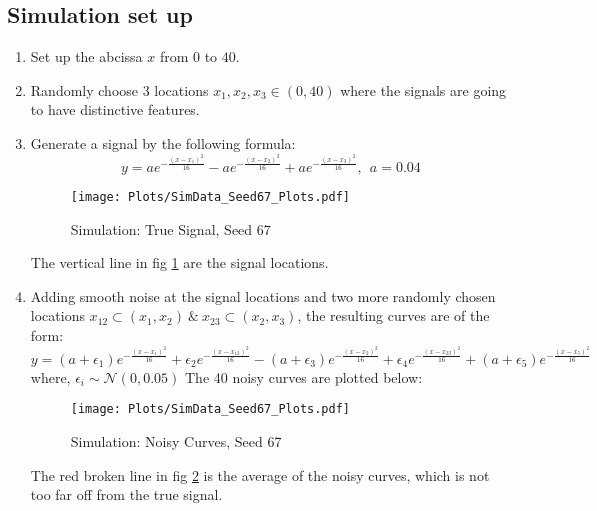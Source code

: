\subsection{Simulation set up}
\begin{enumerate}
\item Set up the abcissa $x$ from $0$ to $40$.

\item Randomly choose 3 locations $x_1, x_2, x_3 \in (0, 40)$ where the signals are going to have distinctive features.

\item Generate a signal by the following formula:
\[ y = ae^{-\frac{(x - x_1)^2}{16}} - ae^{-\frac{(x - x_2)^2}{16}} + ae^{-\frac{(x - x_3)^2}{16}},\ \ a=0.04  \]
\begin{figure}[H]
\begin{center}
\texttt{[image: Plots/SimData\_Seed67\_Plots.pdf]}
\end{center}
\caption{Simulation: True Signal, Seed 67}
\label{fig:FigSim_True}
\end{figure}
The vertical line in fig \ref{fig:FigSim_True} are the signal locations.

\item Adding smooth noise at the signal locations and two more randomly chosen locations $x_{12} \subset (x_1, x_2) \ \& \ x_{23} \subset (x_2, x_3) $, the resulting curves are of the form:
\[ y = (a + \epsilon_1)e^{-\frac{(x - x_1)^2}{16}} + \epsilon_2e^{-\frac{(x - x_12)^2}{16}} - (a + \epsilon_3)e^{-\frac{(x - x_2)^2}{16}} + \epsilon_4e^{-\frac{(x - x_23)^2}{16}} + (a + \epsilon_5)e^{-\frac{(x - x_5)^2}{16}}\]
where, $\epsilon_i \sim \mathcal{N}(0, 0.05)$
The 40 noisy curves are plotted below:
\begin{figure}[H]
\begin{center}
\texttt{[image: Plots/SimData\_Seed67\_Plots.pdf]}
\end{center}
\caption{Simulation: Noisy Curves, Seed 67}
\label{fig:FigSim_Noisy}
\end{figure}
The red broken line in fig \ref{fig:FigSim_Noisy} is the average of the noisy curves, which is not too far off from the true signal. 


\end{enumerate}
